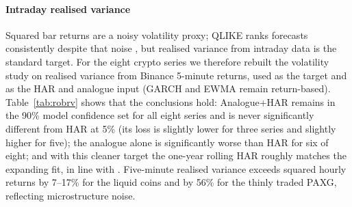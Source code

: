 \paragraph{Intraday realised variance} Squared bar returns are a noisy volatility proxy; QLIKE ranks
forecasts consistently despite that noise \citep{patton2011}, but realised variance from intraday
data is the standard target. For the eight crypto series we therefore rebuilt the volatility study
on realised variance from Binance 5-minute returns, used as the target and as the HAR and analogue
input (GARCH and EWMA remain return-based). Table~\ref{tab:robrv} shows that the conclusions hold:
Analogue+HAR remains in the 90\% model confidence set for all eight series and is never
significantly different from HAR at 5\% (its loss is slightly lower for three series and slightly
higher for five); the
analogue alone is significantly worse than HAR for six of eight; and with this cleaner target the
one-year rolling HAR roughly matches the expanding fit, in line with \citet{chassot2026}. Five-minute
realised variance exceeds squared hourly returns by 7--17\% for the liquid coins and by 56\% for the
thinly traded PAXG, reflecting microstructure noise.

\begin{table}[h]
\centering\scriptsize
\caption{Crypto series with 5-minute realised variance: QLIKE relative to HAR; bold entries are in
the 90\% model confidence set.}
\label{tab:robrv}
\resizebox{\linewidth}{!}{}
\end{table}

